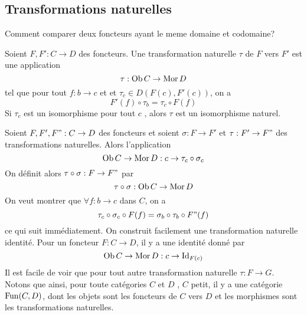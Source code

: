 \documentclass[../main.tex]{subfiles}
\begin{document}
\subsection{Transformations naturelles}
Comment comparer deux foncteurs ayant le meme domaine et codomaine?
\begin{defn}
	Soient $F,F': C\to D$ des foncteurs. Une transformation naturelle $\tau$ de $F$ vers $F'$ est une application
	\[ 
	\tau: \operatorname{Ob} C \to \operatorname{Mor} D
	\]
	tel que pour tout $f: b\to c$ et et $\tau_c \in D( F( c) ,F'( c) ) $, on a
	\[ 
		F'( f) \circ \tau_b = \tau_c \circ F( f) 
	\]
	Si $\tau_c$ est un isomorphisme pour tout $c$ , alors $\tau$ est un isomorphisme naturel.	
	
	
\end{defn}
Soient $F,F', F": C \to D$ des foncteurs et soient $\sigma: F \to F'$ et $\tau: F' \to F"$ des transformations naturelles. Alors l'application
\[ 
\operatorname{Ob} C \to \operatorname{Mor} D: c \to \tau_c \circ \sigma_c
\]
On définit alors $\tau\circ \sigma: F \to F"$ par
\[ 
\tau \circ \sigma: \operatorname{Ob} C \to \operatorname{Mor} D
\]
On veut montrer que $\forall f: b\to c$ dans $C$, on a
\[ 
	\tau_c \circ \sigma_c \circ F( f)  = \sigma_b \circ \tau_b \circ F"( f) 
\]
ce qui suit immédiatement.
On construit facilement une transformation naturelle identité. Pour un foncteur $F: C \to D$, il y a une identité donné par
\[ 
	\operatorname{Ob} C \to \operatorname{Mor} D: c \to \operatorname{Id}_{F( c) } 
\]
Il est facile de voir que pour tout autre transformation naturelle $\tau: F \to G$.\\
Notons que ainsi, pour toute catégories $C$ et $D$ , $C$ petit, il y a une catégorie $\operatorname{Fun}( C,D) $, dont les objets sont les foncteurs de $C$ vers $D$ et les morphismes sont les transformations naturelles.
\end{document}
